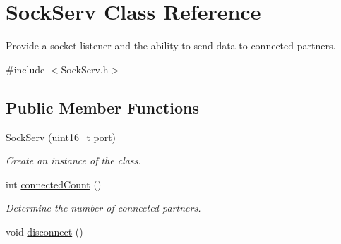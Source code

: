 \hypertarget{class_sock_serv}{}\section{Sock\+Serv Class Reference}
\label{class_sock_serv}


Provide a socket listener and the ability to send data to connected partners.  




{\ttfamily \#include $<$Sock\+Serv.\+h$>$}

\subsection*{Public Member Functions}
\begin{DoxyCompactItemize}
\item 
\hyperlink{class_sock_serv_a8c3fa6bf7bb34ebf9b8db86048ded61c}{Sock\+Serv} (uint16\+\_\+t port)
\begin{DoxyCompactList}\small\item\em Create an instance of the class. \end{DoxyCompactList}\item 
int \hyperlink{class_sock_serv_a74fdc3b3fcb84a1e64505b1c792032f9}{connected\+Count} ()
\begin{DoxyCompactList}\small\item\em Determine the number of connected partners. \end{DoxyCompactList}\item 
void \hyperlink{class_sock_serv_ab82b0f06ba60f2a676e07ad76326c428}{disconnect} ()\hypertarget{class_sock_serv_ab82b0f06ba60f2a676e07ad76326c428}{}\label{class_sock_serv_ab82b0f06ba60f2a676e07ad76326c428}


\end{DoxyCompactItemize}
